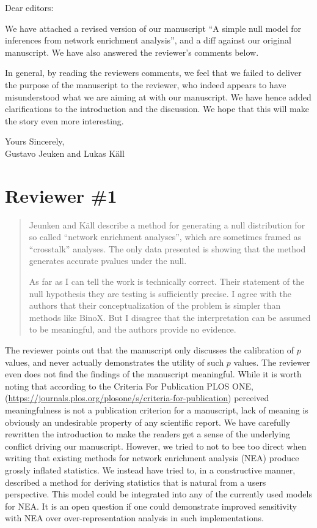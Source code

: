 \documentclass[a4paper]{article}
\newcommand{\breview}{\begin{quotation}\begin{bf}\noindent}
\newcommand{\ereview}{\end{bf}\end{quotation}}
\begin{document}
Dear editors:

We have attached a revised version of our manuscript ``A simple null model for inferences from network enrichment analysis'', and a diff
against our original manuscript. We have also answered the reviewer's comments
below.

In general, by reading the reviewers comments, we feel that we failed to deliver the purpose of the manuscript to the reviewer, who indeed appears to have misunderstood what we are aiming at with our manuscript. We have hence added clarifications to the introduction and the discussion. We hope that this will make the story even more interesting.

Yours Sincerely,\\[1.5cm]
Gustavo Jeuken and
Lukas K\"{a}ll
\\


\section*{Reviewer \#1}
\breview
Jeunken and K\"{a}ll describe a method for generating a null distribution for so called ``network enrichment analyses'', which are sometimes framed as ``crosstalk'' analyses. The only data presented is showing that the method generates accurate pvalues under the null.

\medskip

As far as I can tell the work is technically correct. Their statement of the null hypothesis they are testing is sufficiently precise. I agree with the authors that their conceptualization of the problem is simpler than methods like BinoX. But I disagree that the interpretation can be assumed to be meaningful, and the authors provide no evidence.
\ereview
The reviewer points out that the manuscript only discusses the calibration of $p$ values, and never actually demonstrates the utility of such $p$ values. The reviewer even does not find the findings of the manuscript meaningful. While it is worth noting that  according to the Criteria For Publication PLOS ONE, (\url{https://journals.plos.org/plosone/s/criteria-for-publication}) perceived meaningfulness is not a publication criterion for a manuscript, lack of meaning is obviously an undesirable property of any scientific report. We have carefully rewritten the introduction to make the readers get a sense of the underlying conflict driving our manuscript. However, we tried to not to bee too direct when writing that existing methods for network enrichment analysis (NEA) produce grossly inflated statistics. We instead have tried to, in a constructive manner, described a method for deriving statistics that is natural from a users perspective. This model could be integrated into any of the currently used  models for NEA. It is an open question if one could demonstrate improved sensitivity with NEA over over-representation analysis in such implementations.
\end{document}
